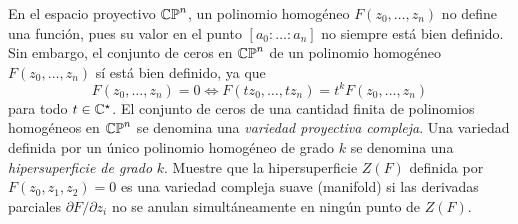 \begin{exercise}
En el espacio proyectivo $\mathbb {CP}^n$, un polinomio homogéneo $F(z_0, \dots, z_n)$ no define una función, pues su valor en el punto $[a_0 : \dots : a_n]$ no siempre está bien definido. Sin embargo, el conjunto de ceros en $\mathbb {CP}^n$ de un polinomio homogéneo $F(z_0, \dots, z_n)$ sí está bien definido, ya que
$$F(z_0, \dots, z_n) = 0 \iff F(tz_0, \dots, tz_n) = t^k F(z_0, \dots, z_n)$$
para todo $t \in \mathbb C^\star$. El conjunto de ceros de una cantidad finita de polinomios homogéneos en $\mathbb {CP}^n$ se denomina una \textit{variedad proyectiva compleja}. Una variedad definida por un único polinomio homogéneo de grado $k$ se denomina una \textit{hipersuperficie de grado} $k$. Muestre que la hipersuperficie $Z(F)$ definida por $F(z_0, z_1, z_2) = 0$ es una variedad compleja suave (manifold) si las derivadas parciales $\partial F / \partial z_i$ no se anulan simultáneamente en ningún punto de $Z(F)$.
\end{exercise}

